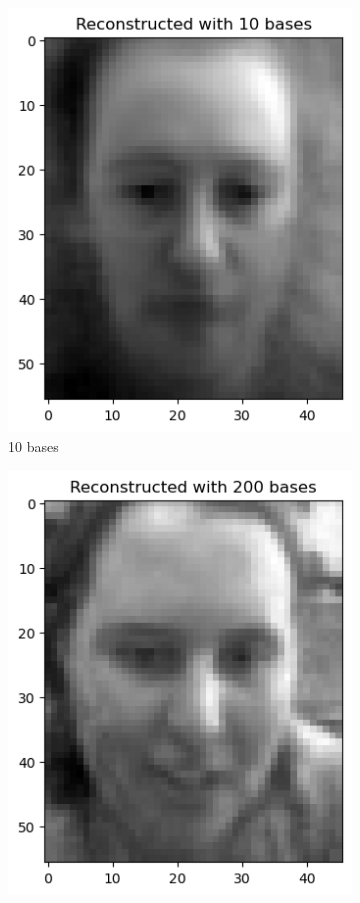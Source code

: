\begin{figure}
\begin{subfigure}[t]{0.2\linewidth}
		\includegraphics[width=\linewidth]{image/q1_recon_train_10.png}
		\caption{10 bases}
		\label{fig:train_re_10}
	\end{subfigure}
    \hfill
	\begin{subfigure}[t]{0.2\linewidth}
		\centering
		\includegraphics[width=\linewidth]{image/q1_recon_train_200.png}

\end{subfigure}
\end{figure}
